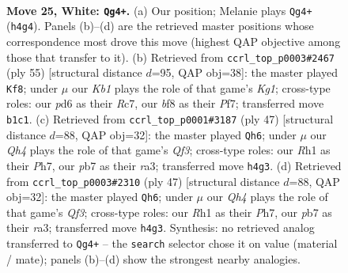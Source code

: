 \documentclass[11pt]{article}
\begin{document}
\clearpage

\begin{figure}[p]\centering
\begin{subfigure}{0.46\textwidth}\centering
\resizebox{\linewidth}{!}{%
\newchessgame
\chessboard[
  setfen={2k2b1r/1p2pp1n/rB1p2p1/1b6/3PP2Q/1P2RP2/6PP/1K5R w - - 2 25},
  showmover=false,
  pgfstyle=straightmove, color=movearrow, markmove={h4-g4}
]}
\caption{}
\end{subfigure}\hfill
\begin{subfigure}{0.46\textwidth}\centering
\resizebox{\linewidth}{!}{%
\newchessgame
\chessboard[
  setfen={4r1k1/1pr2pp1/p3b2p/3p4/3P2P1/P2BR2P/1P3PK1/4R3 b - - 1 28},
  showmover=false,
  pgfstyle=straightmove, color=movearrow, markmove={g8-f8}
]}
\caption{}
\end{subfigure}
\\[4pt]
\begin{subfigure}{0.46\textwidth}\centering
\resizebox{\linewidth}{!}{%
\newchessgame
\chessboard[
  setfen={5r1k/5ppp/3p1q2/3Bp3/4P3/R5PP/1r1b1P2/3Q1RK1 b - - 2 24},
  showmover=false,
  pgfstyle=straightmove, color=movearrow, markmove={f6-h6}
]}
\caption{}
\end{subfigure}\hfill
\begin{subfigure}{0.46\textwidth}\centering
\resizebox{\linewidth}{!}{%
\newchessgame
\chessboard[
  setfen={5r1k/5ppp/3p1q2/3Bp3/4P3/R5PP/1r1b1P2/3Q1RK1 b - - 2 24},
  showmover=false,
  pgfstyle=straightmove, color=movearrow, markmove={f6-h6}
]}
\caption{}
\end{subfigure}
\caption{\textbf{Move 25, White: \texttt{Qg4+}.} (a) Our position; Melanie plays \texttt{Qg4+} (\texttt{h4g4}). Panels (b)--(d) are the retrieved master positions whose correspondence most drove this move (highest QAP objective among those that transfer to it). (b) Retrieved from \texttt{ccrl\_top\_p0003\#2467} (ply 55) [structural distance $d$=95, QAP obj=38]: the master played \texttt{Kf8}; under $\mu$ our \emph{Kb1} plays the role of that game's \emph{Kg1}; cross-type roles: our \emph{p}d6 as their \emph{R}c7, our \emph{b}f8 as their \emph{P}f7; transferred move \texttt{b1c1}. (c) Retrieved from \texttt{ccrl\_top\_p0001\#3187} (ply 47) [structural distance $d$=88, QAP obj=32]: the master played \texttt{Qh6}; under $\mu$ our \emph{Qh4} plays the role of that game's \emph{Qf3}; cross-type roles: our \emph{R}h1 as their \emph{P}h7, our \emph{p}b7 as their \emph{r}a3; transferred move \texttt{h4g3}. (d) Retrieved from \texttt{ccrl\_top\_p0003\#2310} (ply 47) [structural distance $d$=88, QAP obj=32]: the master played \texttt{Qh6}; under $\mu$ our \emph{Qh4} plays the role of that game's \emph{Qf3}; cross-type roles: our \emph{R}h1 as their \emph{P}h7, our \emph{p}b7 as their \emph{r}a3; transferred move \texttt{h4g3}. Synthesis: no retrieved analog transferred to \texttt{Qg4+} -- the \texttt{search} selector chose it on value (material / mate); panels (b)--(d) show the strongest nearby analogies.}
\label{fig:thought-m48}
\end{figure}
\end{document}
